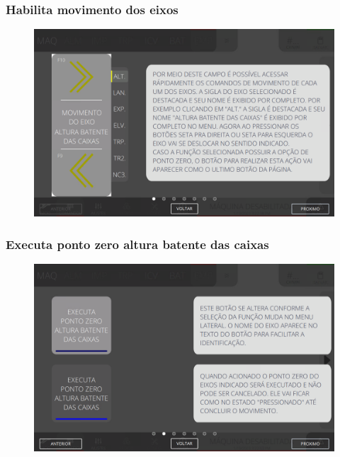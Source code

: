 \newpage
\thispagestyle{fancy}
\vspace*{40 pt}
\subsubsection{\small {Habilita movimento dos eixos}} \label{sec:telaComandosEmpilhador2HabilitaMovimentoEixos}
\vspace*{\fill}
\begin{figure}[h]
    \centering
    \includegraphics[width=576 px,height=360 px]{src/imagesICV/08-stacker/commands/e-6.png}
\end{figure}
\vspace*{\fill}

\newpage
\thispagestyle{fancy}
\vspace*{40 pt}
\subsubsection{\small {Executa ponto zero altura batente das caixas}} \label{sec:telaComandosEmpilhador2ExecutaPontoZeroAlturaBatenteCaixas}
\vspace*{\fill}
\begin{figure}[h]
    \centering
    \includegraphics[width=576 px,height=360 px]{src/imagesICV/08-stacker/commands/e-7.png}
\end{figure}
\vspace*{\fill}

